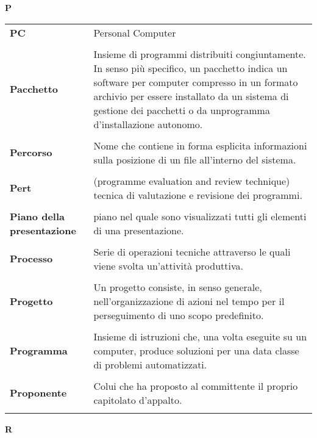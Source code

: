 \newpage 
{} 
{} 
\hfill\Huge{\textbf{P}} \\ 
\normalsize 
\begin{longtable}{L{4cm} p{10cm}}
\textbf{PC} & Personal Computer \\ 
 \\ 
\textbf{Pacchetto} & Insieme di programmi distribuiti congiuntamente. In senso più specifico, un pacchetto indica un software per computer compresso in un formato archivio per essere installato da un sistema di gestione dei pacchetti o da unprogramma d'installazione autonomo. \\ 
 \\ 
\textbf{Percorso} & Nome che contiene in forma esplicita informazioni sulla posizione di un file all'interno del sistema. \\ 
 \\ 
\textbf{Pert} & (programme evaluation and review technique) tecnica di valutazione e revisione dei programmi. \\ 
 \\ 
\textbf{Piano della presentazione} & piano nel quale sono visualizzati tutti gli elementi di una presentazione. \\ 
 \\ 
\textbf{Processo} & Serie di operazioni tecniche attraverso le quali viene svolta un'attività produttiva. \\ 
 \\ 
\textbf{Progetto} & Un progetto consiste, in senso generale, nell'organizzazione di azioni nel tempo per il perseguimento di uno scopo predefinito. \\ 
 \\ 
\textbf{Programma} & Insieme di istruzioni che, una volta eseguite su un computer, produce soluzioni per una data classe di problemi automatizzati. \\ 
 \\ 
\textbf{Proponente} & Colui che ha proposto al committente il proprio capitolato d’appalto. \\ 
 \\ 
\end{longtable} 
\newpage 
{} 
{} 
\hfill\Huge{\textbf{R}} \\ 
\normalsize 
